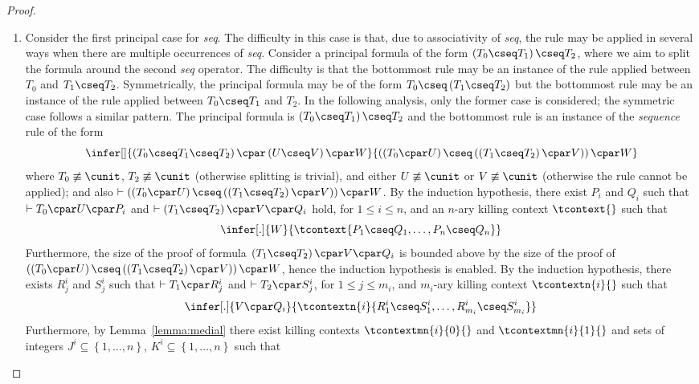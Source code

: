 \begin{proof}
\begin{enumerate}[label=\textbf{\Alph*},ref=\Alph*,leftmargin=*]
\begin{enumerate}[label*=\textbf{.\arabic*}]
\item Consider the first principal case for \textit{seq}.
The difficulty in this case is that, due to associativity of \textit{seq}, the \rseq rule may be applied in several ways when there are multiple occurrences of \textit{seq}.
Consider a principal formula of the form $\left(T_0 \cseq T_1\right) \cseq T_2$, where we aim to split the formula around the second \textit{seq} operator. The difficulty is that the bottommost rule may be an instance of the \rseq rule applied between $T_0$ and $T_1 \cseq T_2$. Symmetrically, the principal formula may be of the form $T_0 \cseq \left(T_1 \cseq T_2\right)$ but the bottommost rule may be an instance of the \rseq rule applied between $T_0 \cseq T_1$ and $T_2$.
In the following analysis, only the former case is considered; the symmetric case follows a similar pattern.
The principal formula is $\left(T_0 \cseq T_1\right) \cseq T_2$ and the bottommost rule is an instance of the \textit{sequence} rule of the form
\[
\infer[]{
\left( T_0 \cseq T_1 \cseq T_2 \right) \cpar \left( U \cseq V \right) \cpar W
}{
\left(\left( T_0 \cpar U \right) \cseq \left( \left(T_1 \cseq T_2\right) \cpar V \right)\right) \cpar W
}
\] 
where $T_0 \not\equiv \cunit$, $T_2 \not\equiv \cunit$ (otherwise splitting is trivial), and either $U \not\equiv \cunit$ or $V \not\equiv \cunit$ (otherwise the \rseq rule cannot be applied);
and also $\vdash \left(\left( T_0 \cpar U \right) \cseq \left( \left(T_1 \cseq T_2\right) \cpar V \right)\right) \cpar W$.
By the induction hypothesis, there exist $P_i$ and $Q_i$ such that $\vdash T_0 \cpar U \cpar P_i$ and $\vdash \left(T_1 \cseq T_2\right) \cpar V \cpar Q_i$ hold, for $1 \leq i \leq n$, and an $n$-ary killing context $\tcontext{}$ such that 
\[
\infer[.]{W}{
\tcontext{ P_1 \cseq Q_1, \hdots, P_n \cseq Q_n }
}
\]
Furthermore,
the size of the proof of formula
$
\left(T_1 \cseq T_2\right) \cpar V \cpar Q_i
$
is bounded above by the size of the proof of
$\left(\left( T_0 \cpar U \right) \cseq \left( \left(T_1 \cseq T_2\right) \cpar V \right)\right) \cpar W$, hence the induction hypothesis is enabled.
By the induction hypothesis, there exists $R^i_j$ and $S^i_j$ such that $\vdash T_1 \cpar R^i_j$ and $\vdash T_2 \cpar S^i_j$, for $1 \leq j \leq m_i$, and $m_i$-ary killing context $\tcontextn{i}{}$ such that
\[
\infer[.]{
V \cpar Q_i
}{
\tcontextn{i}{R^i_1 \cseq S^i_1, \hdots, R^i_{m_i} \cseq S^i_{m_i}}
}
\]
Furthermore, by Lemma~\ref{lemma:medial} there exist killing contexts $\tcontextmn{i}{0}{}$ and $\tcontextmn{i}{1}{}$ and sets of integers $J^i \subseteq \left\{1, \hdots, n\right\}$, $K^i \subseteq \left\{1, \hdots, n\right\}$ such that

\end{enumerate}
\end{enumerate}
\end{proof}

